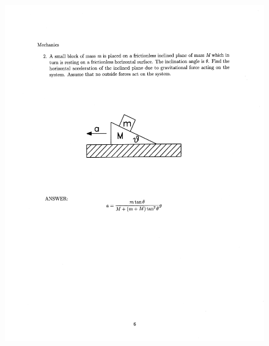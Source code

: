 \documentclass[10pt,a4paper]{article}
\begin{document}
\begin{figure}[H]
 \centering
 \includegraphics[width=16cm]{pdf/1-1T36.png}
\end{figure}
 \newpage
\end{document}
